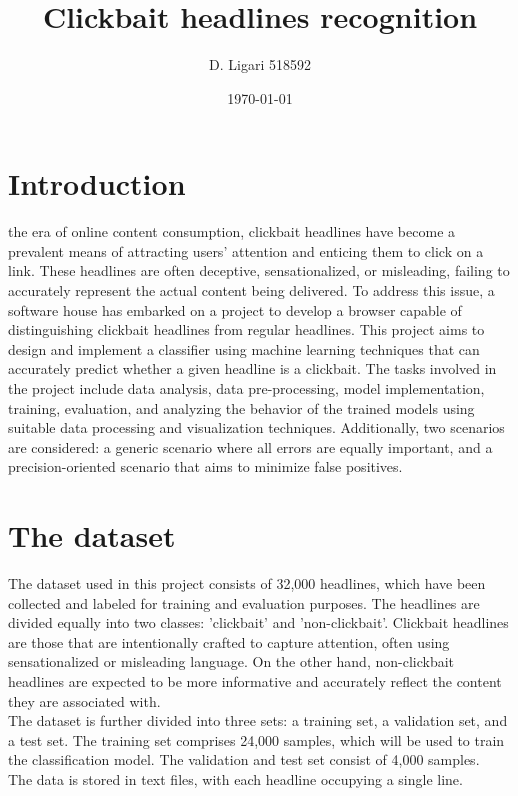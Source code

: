 \documentclass{class}
\title{Clickbait headlines recognition}
\author[1]{D. Ligari 518592}
\affil[1]{Machine Learning course, University of Pavia, Department of Computer Engineering (Data Science), Pavia, Italy}
\date{\today}
\begin{document}
\maketitle
\thispagestyle{FirstPage}
\tableofcontents
\section{Introduction}
the era of online content consumption, clickbait headlines have become a prevalent means of attracting users' attention and enticing them to click on a link.
These headlines are often deceptive, sensationalized, or misleading, failing to accurately represent the actual content being delivered.
To address this issue, a software house has embarked on a project to develop a browser capable of distinguishing clickbait headlines from regular headlines.
This project aims to design and implement a classifier using machine learning techniques that can accurately predict whether a given headline is a clickbait.
The tasks involved in the project include data analysis, data pre-processing, model implementation, training, evaluation, and analyzing the behavior
of the trained models using suitable data processing and visualization techniques.
Additionally, two scenarios are considered: a generic scenario where all errors are equally important, and a precision-oriented scenario
that aims to minimize false positives.

\section{The dataset}
The dataset used in this project consists of 32,000 headlines, which have been collected and labeled for training and evaluation purposes.
The headlines are divided equally into two classes: 'clickbait' and 'non-clickbait'.
Clickbait headlines are those that are intentionally crafted to capture attention,
often using sensationalized or misleading language.
On the other hand, non-clickbait headlines are expected to be more informative and accurately reflect the content they are associated with.\\
The dataset is further divided into three sets: a training set, a validation set, and a test set.
The training set comprises 24,000 samples, which will be used to train the classification model. The validation and test set consist of 4,000 samples.\\
The data is stored in text files, with each headline occupying a single line.
\end{document}

